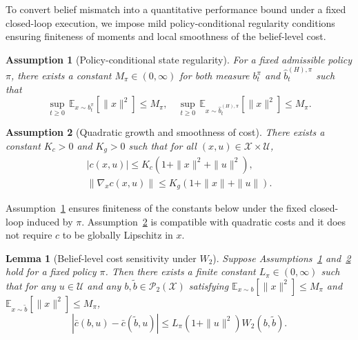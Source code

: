 \documentclass[letterpaper, 10 pt, conference]{ieeeconf}
\newtheorem{assumption}{Assumption}
\newtheorem{lemma}{Lemma}
\begin{document}
To convert belief mismatch into a quantitative performance bound under a fixed closed-loop execution, we impose mild policy-conditional regularity conditions ensuring finiteness of moments and local smoothness of the belief-level cost.
\begin{assumption}[Policy-conditional state regularity]
\label{assump:state-moment-regularity}
For a fixed admissible policy $\pi$, there exists a constant $M_\pi\in (0, \infty)$ for both measure $b_t^\pi$ and $\hat{b}_t^{(H),\pi}$ such that
\begin{equation}
\sup_{t\ge 0}\,
\mathbb{E}_{x\sim b_t^\pi}\!\left[\|x\|^2\right] \le M_\pi, \quad
\sup_{t\ge 0}\, \mathbb{E}_{x\sim \hat b_t^{(H),\pi}}\!\left[\|x\|^2\right] \le M_\pi.
\end{equation}
\end{assumption}

\begin{assumption}[Quadratic growth and smoothness of cost]
\label{assump:cost-regularity}
There exists a constant $K_c>0$ and $K_g>0$ such that for all $(x,u)\in\mathcal{X}\times\mathcal{U}$,
\begin{align}
|c(x,u)| \le K_c\left(1+\|x\|^2+\|u\|^2\right), \\
\|\nabla_x c(x,u)\| \le K_g\left(1+\|x\|+\|u\|\right).
\end{align}
\end{assumption}

Assumption~\ref{assump:state-moment-regularity} ensures finiteness of the constants below under the fixed closed-loop induced by $\pi$.
Assumption~\ref{assump:cost-regularity} is compatible with quadratic costs and it does not require $c$ to be globally Lipschitz in $x$.

\begin{lemma}[Belief-level cost sensitivity under $W_2$]
\label{lem:cost-sensitivity}
Suppose Assumptions~\ref{assump:state-moment-regularity} and~\ref{assump:cost-regularity} hold for a fixed policy $\pi$.
Then there exists a finite constant $L_\pi\in (0, \infty)$ such that for any $u\in\mathcal{U}$ and any $b,\tilde b\in\mathcal{P}_2(\mathcal{X})$ satisfying
$\mathbb{E}_{x\sim b}[\|x\|^2] \le M_\pi$ and
$\mathbb{E}_{x\sim \tilde b}[\|x\|^2] \le M_\pi$,
\begin{equation}
\left|\bar c(b,u)-\bar c(\tilde b,u)\right|
\le
L_\pi\left(1+\|u\|^2\right)W_2(b,\tilde b).
\end{equation}
\end{lemma}
\end{document}
